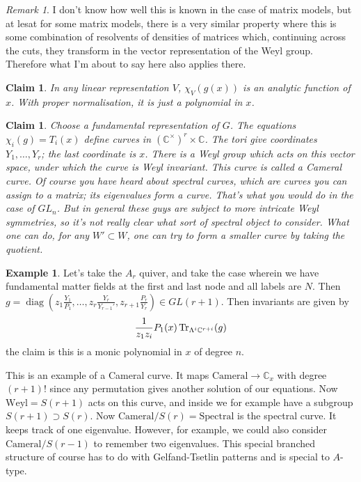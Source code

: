 \documentclass[leqno, openany]{memoir}
\newtheorem{clm}[thm]{Claim}
\theoremstyle{definition}
\newtheorem{exm}[thm]{Example}
\theoremstyle{remark}
\newtheorem{rmk}[thm]{Remark}
\theoremstyle{plain}
\theoremstyle{definition}
\theoremstyle{remark}
\newcommand{\mr}[1]{\mathrm{#1}}
\newcommand{\on}[1]{\operatorname{#1}}
\begin{document}
\begin{rmk}
I don't know how well this is known in the case of matrix models, but at lesat for some matrix models, there is a very similar property where this is some combination of resolvents of densities
of matrices which, continuing across the cuts, they transform in the vector representation of the Weyl group. Therefore what I'm about to say here also applies there.
\end{rmk}

\begin{clm}
In any linear representation $V$, $\chi_V(g(x))$ is an analytic function of $x$.
With proper normalisation, it is just a polynomial in $x$.
\end{clm}

\begin{clm}
  Choose a fundamental representation of $G$. The equations 
$\chi_i(g) = T_i(x)$ define curves in $(\mathbb{C}^\times)^r \times \mathbb{C}$.
The tori give coordinates $Y_1,\dots,Y_r$; the last coordinate is $x$. 
There is a Weyl group which acts on this vector space, under which the curve is Weyl invariant.
This curve is called a \emph{Cameral curve}. Of course you have heard about spectral curves, which are curves you can assign to a matrix; its eigenvalues form a curve. That's what you would do in the case of $GL_n$. But in general these guys are subject to more intricate Weyl symmetries,
so it's not really clear what sort of spectral object to consider.
What one can do, for any $W' \subset W$, one can try to form a smaller curve by taking the quotient.
\end{clm}

\begin{exm}
  Let's take the $A_r$ quiver, and take the case wherein we have fundamental matter fields at the first and last node and all labels are $N$.
  Then $g = \on{diag}(z_1 \frac{Y_1}{P_1},\dots, z_r \frac{Y_r}{Y_{r-1}'}, z_{r+1} \frac{P_r}{Y_r}) \in GL(r+1)$.
Then invariants are given by 
\[
\frac{1}{z_1 z_i} P_1(x) \Tr_{\Lambda^i \mathbb{C}^{r+ i}}(g)
\]
the claim is this is a monic polynomial in $x$ of degree $n$. 

This is an example of a Cameral curve. It maps $\mr{Cameral} \to \mathbb{C}_x$ with degree $(r+1)!$ since any permutation gives another solution of our equations.
Now $\mr{Weyl} = S(r+1)$ acts on this curve, and inside we for example have a subgroup $S(r+1) \supset S(r)$. Now $\mr{Cameral}/S(r) = \mr{Spectral}$ is the spectral curve.
It keeps track of one eigenvalue. However, for example, we could also consider $\mr{Cameral}/S(r-1)$ to remember two eigenvalues. 
This special branched structure of course has to do with Gelfand-Tsetlin patterns and is special to $A$-type.
\end{exm}
\end{document}

